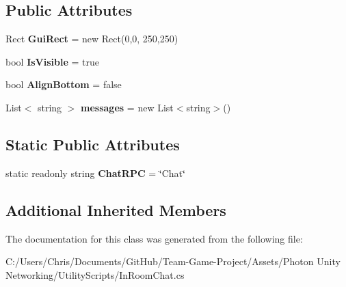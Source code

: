 \subsection*{Public Attributes}
\begin{DoxyCompactItemize}
\item 
Rect {\bfseries Gui\+Rect} = new Rect(0,0, 250,250)\hypertarget{class_in_room_chat_acc85d6ed055432d0cff5a93f8de88a39}{}\label{class_in_room_chat_acc85d6ed055432d0cff5a93f8de88a39}

\item 
bool {\bfseries Is\+Visible} = true\hypertarget{class_in_room_chat_adbfef915a36e98692020697a6cacfca6}{}\label{class_in_room_chat_adbfef915a36e98692020697a6cacfca6}

\item 
bool {\bfseries Align\+Bottom} = false\hypertarget{class_in_room_chat_a83f0c6044fed77a2950457f30ac2607c}{}\label{class_in_room_chat_a83f0c6044fed77a2950457f30ac2607c}

\item 
List$<$ string $>$ {\bfseries messages} = new List$<$string$>$()\hypertarget{class_in_room_chat_aaf95335cf66ac85905d13191dd5da780}{}\label{class_in_room_chat_aaf95335cf66ac85905d13191dd5da780}

\end{DoxyCompactItemize}
\subsection*{Static Public Attributes}
\begin{DoxyCompactItemize}
\item 
static readonly string {\bfseries Chat\+R\+PC} = \char`\"{}Chat\char`\"{}\hypertarget{class_in_room_chat_aa0b4576ed000e07dc1dc587afcf0f21c}{}\label{class_in_room_chat_aa0b4576ed000e07dc1dc587afcf0f21c}

\end{DoxyCompactItemize}
\subsection*{Additional Inherited Members}


The documentation for this class was generated from the following file\+:\begin{DoxyCompactItemize}
\item 
C\+:/\+Users/\+Chris/\+Documents/\+Git\+Hub/\+Team-\/\+Game-\/\+Project/\+Assets/\+Photon Unity Networking/\+Utility\+Scripts/In\+Room\+Chat.\+cs\end{DoxyCompactItemize}
